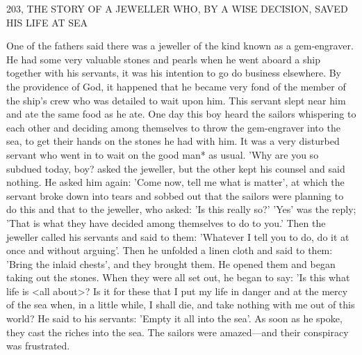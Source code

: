 203, THE STORY OF A JEWELLER WHO,
BY A WISE DECISION, SAVED HIS LIFE AT SEA

One of the fathers said there was a jeweller of the kind known as a
gem-engraver.
He had some very valuable stones and pearls when
he went aboard a ship together with his servants, it was his
intention to go do business elsewhere.
By the providence of God, it
happened that he became very fond of the member of the ship's
crew who was detailed to wait upon him.
This servant slept near
him and ate the same food as he ate.
One day this boy heard the
sailors whispering to each other and deciding among themselves to
throw the gem-engraver into the sea, to get their hands on the
stones he had with him.
It was a very disturbed servant who went
in to wait on the good man* as usual.
'Why are you so subdued
today, boy? asked the jeweller, but the other kept his counsel and
said nothing.
He asked him again: 'Come now, tell me what is
matter', at which the servant broke down into tears and sobbed out
that the sailors were planning to do this and that to the jeweller,
who asked: 'Is this really so?' 'Yes' was the reply; 'That is what they
have decided among themselves to do to you.' Then the jeweller
called his servants and said to them: 'Whatever I tell you to do, do
it at once and without arguing'.
Then he unfolded a linen cloth and
said to them: 'Bring the inlaid chests', and they brought them.
He
opened them and began taking out the stones.
When they were all
set out, he began to say: 'Is this what life is <all about>? Is it for
these that I put my life in danger and at the mercy of the sea when,
in a little while, I shall die, and take nothing with me out of this
world? He said to his servants: 'Empty it all into the sea'.
As soon
as he spoke, they cast the riches into the sea.
The sailors were
amazed—and their conspiracy was frustrated.

